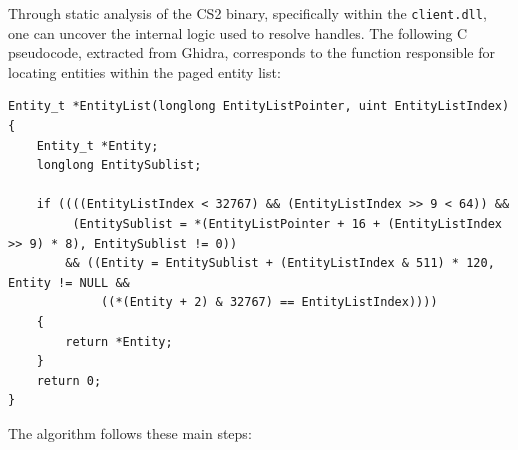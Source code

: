Through static analysis of the CS2 binary, specifically within the \texttt{client.dll}, one can uncover the internal logic used to resolve handles. The following C pseudocode, extracted from Ghidra, corresponds to the function responsible for locating entities within the paged entity list:

\begin{lstlisting}[style=cppstyle,caption={Accessing an Entity in the Entity List}]
Entity_t *EntityList(longlong EntityListPointer, uint EntityListIndex)
{
    Entity_t *Entity;
    longlong EntitySublist;

    if ((((EntityListIndex < 32767) && (EntityListIndex >> 9 < 64)) &&
         (EntitySublist = *(EntityListPointer + 16 + (EntityListIndex >> 9) * 8), EntitySublist != 0))
        && ((Entity = EntitySublist + (EntityListIndex & 511) * 120, Entity != NULL &&
             ((*(Entity + 2) & 32767) == EntityListIndex))))
    {
        return *Entity;
    }
    return 0;
}   
\end{lstlisting}

The algorithm follows these main steps:

